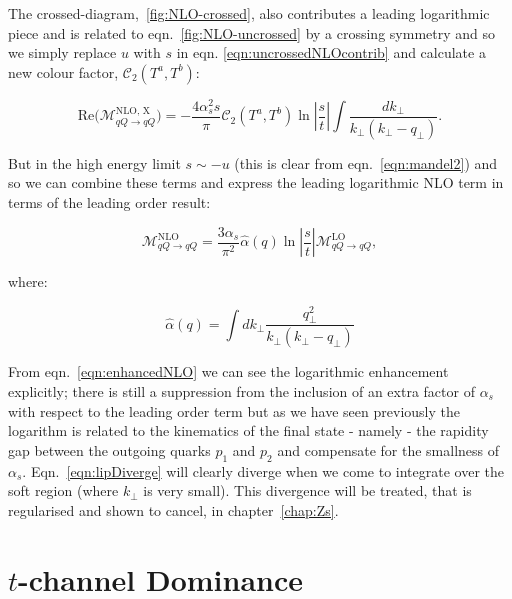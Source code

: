 	The crossed-diagram,~\eqref{fig:NLO-crossed}, also contributes a leading logarithmic piece and is related to
	eqn.~\eqref{fig:NLO-uncrossed} by a crossing symmetry and so we simply replace $u$ with $s$ in eqn.
	\eqref{eqn:uncrossedNLOcontrib} and calculate a new colour factor, $\mathcal{C}_2(T^a,T^b)$:

	\begin{equation}
		\text{Re}\Big(\mathcal{M}_{qQ\rightarrow qQ}^{\text{NLO, X}}\Big) =
		-\frac{4\alpha_s^2s}{\pi} \mathcal{C}_2(T^a,T^b)
		\ln\left|\frac{s}{t}\right| \int \frac{dk_{\perp}}{k_{\perp}(k_{\perp} - q_{\perp})}.
		\label{eqn:crossedNLOcontrib}
	\end{equation}

	But in the high energy limit $s\sim -u$ (this is clear from eqn.~\eqref{eqn:mandel2}) and so we
	can combine these terms and express the leading logarithmic NLO term in terms of the leading order
	result:

	\begin{equation}
		\mathcal{M}_{qQ\rightarrow qQ}^{\text{NLO}} = \frac{3\alpha_s}{\pi^2}
		\hat{\alpha}(q)\ln\left|\frac{s}{t}\right|
		\mathcal{M}_{qQ\rightarrow qQ}^{\text{LO}},
		\label{eqn:enhancedNLO}
	\end{equation}

	where:

	\begin{equation}
		\hat{\alpha}(q) = \int dk_{\perp}\frac{q_{\perp}^2}{k_{\perp}(k_{\perp} - q_{\perp})}
		\label{eqn:lipDiverge}
	\end{equation}

	From eqn.~\eqref{eqn:enhancedNLO} we can see the logarithmic enhancement explicitly; there is still
	a suppression from the inclusion of an extra factor of $\alpha_s$ with respect to the leading
	order term but as we have seen previously the logarithm is related to the kinematics of the final
	state - namely - the rapidity gap between the outgoing quarks $p_1$ and $p_2$ and compensate
	for the smallness of $\alpha_s$.  Eqn.~\eqref{eqn:lipDiverge} will clearly diverge when we
	come to integrate over the soft region (where $k_\perp$ is very small).  This divergence
	will be treated, that is regularised and shown to cancel, in chapter~\ref{chap:Zs}.

\section{$t$-channel Dominance}
	\label{sec:tChannel}

